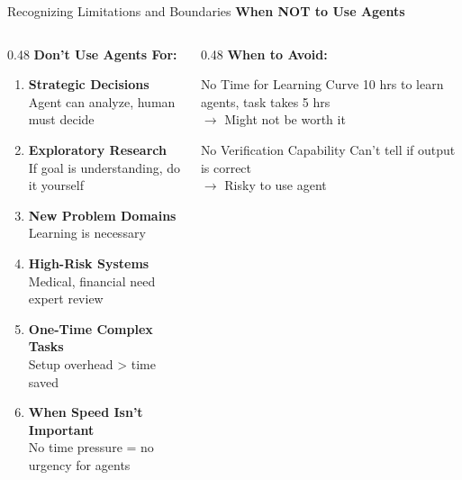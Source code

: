 \documentclass[aspectratio=169,11pt]{beamer}
\begin{document}
\begin{frame}{Recognizing Limitations and Boundaries}
    \textbf{When NOT to Use Agents}

    \begin{columns}[T]
        \begin{column}{0.48\textwidth}
            \textbf{Don't Use Agents For:}

            \begin{enumerate}
                \item \textbf{Strategic Decisions}\\
                Agent can analyze, human must decide

                \item \textbf{Exploratory Research}\\
                If goal is understanding, do it yourself

                \item \textbf{New Problem Domains}\\
                Learning is necessary

                \item \textbf{High-Risk Systems}\\
                Medical, financial need expert review

                \item \textbf{One-Time Complex Tasks}\\
                Setup overhead > time saved

                \item \textbf{When Speed Isn't Important}\\
                No time pressure = no urgency for agents
            \end{enumerate}
        \end{column}
        \begin{column}{0.48\textwidth}
            \textbf{When to Avoid:}

            \begin{block}{No Time for Learning Curve}
                10 hrs to learn agents, task takes 5 hrs\\
                $\rightarrow$ Might not be worth it
            \end{block}

            \begin{block}{No Verification Capability}
                Can't tell if output is correct\\
                $\rightarrow$ Risky to use agent
            \end{block}


\end{column}
\end{columns}
\end{frame}
\end{document}
